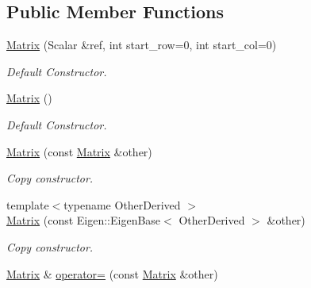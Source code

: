 \subsection*{Public Member Functions}
\begin{DoxyCompactItemize}
\item 
\hyperlink{classow__core_1_1Matrix_a4de3f741251028d3c8c57add9c0fdaa7}{Matrix} (Scalar \&ref, int start\+\_\+row=0, int start\+\_\+col=0)\hypertarget{classow__core_1_1Matrix_a4de3f741251028d3c8c57add9c0fdaa7}{}\label{classow__core_1_1Matrix_a4de3f741251028d3c8c57add9c0fdaa7}

\begin{DoxyCompactList}\small\item\em Default Constructor. \end{DoxyCompactList}\item 
\hyperlink{classow__core_1_1Matrix_a8e12fedab56b3c35846d574c8b28c6c9}{Matrix} ()\hypertarget{classow__core_1_1Matrix_a8e12fedab56b3c35846d574c8b28c6c9}{}\label{classow__core_1_1Matrix_a8e12fedab56b3c35846d574c8b28c6c9}

\begin{DoxyCompactList}\small\item\em Default Constructor. \end{DoxyCompactList}\item 
\hyperlink{classow__core_1_1Matrix_a56f3da2668d5aca739f1c4c4dadb6654}{Matrix} (const \hyperlink{classow__core_1_1Matrix}{Matrix} \&other)\hypertarget{classow__core_1_1Matrix_a56f3da2668d5aca739f1c4c4dadb6654}{}\label{classow__core_1_1Matrix_a56f3da2668d5aca739f1c4c4dadb6654}

\begin{DoxyCompactList}\small\item\em Copy constructor. \end{DoxyCompactList}\item 
{\footnotesize template$<$typename Other\+Derived $>$ }\\\hyperlink{classow__core_1_1Matrix_a213b412d7172b27a887352a549ef6d2c}{Matrix} (const Eigen\+::\+Eigen\+Base$<$ Other\+Derived $>$ \&other)
\begin{DoxyCompactList}\small\item\em Copy constructor. \end{DoxyCompactList}\item 
\hyperlink{classow__core_1_1Matrix}{Matrix} \& \hyperlink{classow__core_1_1Matrix_a24f3cef489a02ef7280c347f783fc2e8}{operator=} (const \hyperlink{classow__core_1_1Matrix}{Matrix} \&other)\hypertarget{classow__core_1_1Matrix_a24f3cef489a02ef7280c347f783fc2e8}{}\label{classow__core_1_1Matrix_a24f3cef489a02ef7280c347f783fc2e8}


\end{DoxyCompactItemize}
